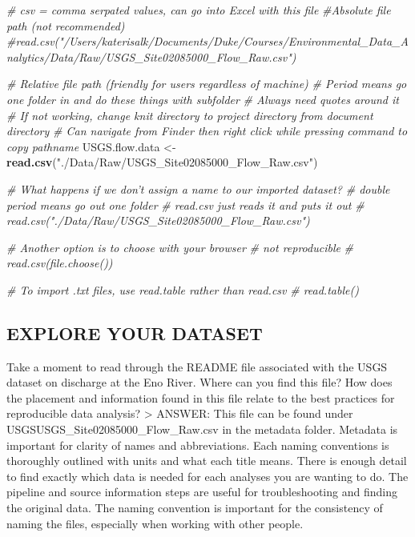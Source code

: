 \documentclass[]{article}
\newenvironment{Shaded}{\begin{snugshade}}{\end{snugshade}}
\newcommand{\CommentTok}[1]{\textcolor[rgb]{0.56,0.35,0.01}{\textit{#1}}}
\newcommand{\KeywordTok}[1]{\textcolor[rgb]{0.13,0.29,0.53}{\textbf{#1}}}
\newcommand{\NormalTok}[1]{#1}
\newcommand{\StringTok}[1]{\textcolor[rgb]{0.31,0.60,0.02}{#1}}
\begin{document}
\begin{Shaded}
\begin{Highlighting}[]
\CommentTok{# csv = comma serpated values, can go into Excel with this file}
\CommentTok{#Absolute file path (not recommended)}
\CommentTok{#read.csv("/Users/katerisalk/Documents/Duke/Courses/Environmental_Data_Analytics/Data/Raw/USGS_Site02085000_Flow_Raw.csv")}

\CommentTok{# Relative file path (friendly for users regardless of machine)}
\CommentTok{# Period means go one folder in and do these things with subfolder}
\CommentTok{# Always need quotes around it}
\CommentTok{# If not working, change knit directory to project directory from document directory}
\CommentTok{# Can navigate from Finder then right click while pressing command to copy pathname}
\NormalTok{USGS.flow.data <-}\StringTok{ }\KeywordTok{read.csv}\NormalTok{(}\StringTok{"./Data/Raw/USGS_Site02085000_Flow_Raw.csv"}\NormalTok{)}

\CommentTok{# What happens if we don't assign a name to our imported dataset?}
\CommentTok{# double period means go out one folder}
\CommentTok{# read.csv just reads it and puts it out}
\CommentTok{# read.csv("./Data/Raw/USGS_Site02085000_Flow_Raw.csv")}

\CommentTok{# Another option is to choose with your browser}
\CommentTok{# not reproducible}
\CommentTok{# read.csv(file.choose())}

\CommentTok{# To import .txt files, use read.table rather than read.csv}
\CommentTok{# read.table()}
\end{Highlighting}
\end{Shaded}

\hypertarget{explore-your-dataset}{%
\subsection{EXPLORE YOUR DATASET}\label{explore-your-dataset}}

Take a moment to read through the README file associated with the USGS
dataset on discharge at the Eno River. Where can you find this file? How
does the placement and information found in this file relate to the best
practices for reproducible data analysis? \textgreater{} ANSWER: This
file can be found under USGSUSGS\_Site02085000\_Flow\_Raw.csv in the
metadata folder. Metadata is important for clarity of names and
abbreviations. Each naming conventions is thoroughly outlined with units
and what each title means. There is enough detail to find exactly which
data is needed for each analyses you are wanting to do. The pipeline and
source information steps are useful for troubleshooting and finding the
original data. The naming convention is important for the consistency of
naming the files, especially when working with other people.
\end{document}
